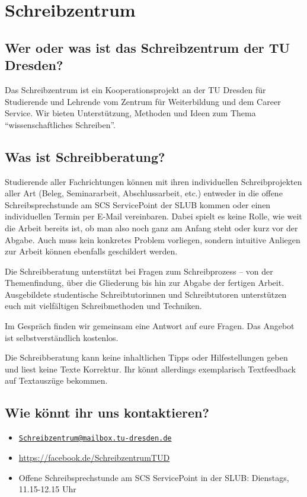 \section*{Schreibzentrum}
\label{sec:schreibzentrum}
\subsection*{Wer oder was ist das Schreibzentrum der TU Dresden?}
\label{sub:wer_oder_was_ist_das_schreibzentrum_der_tu_dresden_}
Das Schreibzentrum ist ein Kooperationsprojekt an der TU Dresden für Studierende und Lehrende
vom Zentrum für Weiterbildung und dem Career Service. Wir bieten Unterstützung, Methoden und
Ideen zum Thema \enquote{wissenschaftliches Schreiben}.

\subsection*{Was ist Schreibberatung?}
Studierende aller Fachrichtungen können mit ihren individuellen Schreibprojekten aller Art (Beleg,
Seminararbeit, Abschlussarbeit, etc.) entweder in die offene Schreibsprechstunde am SCS
ServicePoint der SLUB kommen oder einen individuellen Termin per E-Mail vereinbaren. Dabei spielt
es keine Rolle, wie weit die Arbeit bereits ist, ob man also noch ganz am Anfang steht oder kurz vor
der Abgabe. Auch muss kein konkretes Problem vorliegen, sondern intuitive Anliegen zur Arbeit
können ebenfalls geschildert werden.

Die Schreibberatung unterstützt bei Fragen zum Schreibprozess -- von der Themenfindung, über die
Gliederung bis hin zur Abgabe der fertigen Arbeit. Ausgebildete studentische Schreibtutorinnen und
Schreibtutoren unterstützen euch mit vielfältigen Schreibmethoden und Techniken.

Im Gespräch finden wir gemeinsam eine Antwort auf eure Fragen. Das Angebot ist selbstverständlich
kostenlos.

Die Schreibberatung kann keine inhaltlichen Tipps oder Hilfestellungen geben und liest keine Texte
Korrektur. Ihr könnt allerdings exemplarisch Textfeedback auf Textauszüge bekommen.

\subsection*{Wie könnt ihr uns kontaktieren?}
\label{sub:wie_konnt_ihr_uns_kontaktieren_}
\begin{itemize}
  \item \href{mailto:Schreibzentrum@mailbox.tu-dresden.de}{\nolinkurl{Schreibzentrum@mailbox.tu-dresden.de}}
    \item \url{https://facebook.de/SchreibzentrumTUD}
    \item Offene Schreibsprechstunde am SCS ServicePoint in der SLUB: Dienstags, 11.15-12.15 Uhr
    
\end{itemize}

